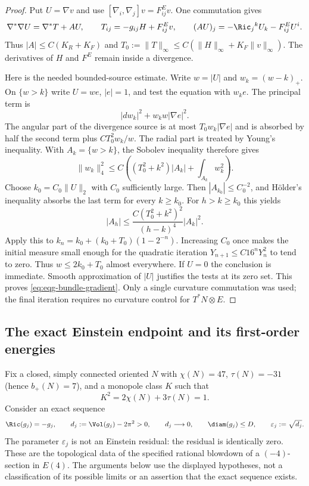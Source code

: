 \begin{proof}
Put $U=\nabla v$ and use $[\nabla_i,\nabla_j]v=F^E_{ij}v$.
One commutation gives
\[
 \nabla^*\nabla U=\nabla^*T+AU,
 \qquad T_{ij}=-g_{ij}H+F^E_{ij}v,
 \qquad (AU)_j=-\Ric_j{}^kU_k-F^E_{ij}U^i.
\]
Thus $|A|\leq C(K_R+K_F)$ and
$T_0:=\|T\|_\infty\leq C(\|H\|_\infty+K_F\|v\|_\infty)$.
The derivatives of $H$ and $F^E$ remain inside a divergence.

Here is the needed bounded-source estimate.  Write $w=|U|$ and
$w_k=(w-k)_+$.  On $\{w>k\}$ write $U=we$, $|e|=1$,
and test the equation with $w_ke$.  The principal term is
\[
 |dw_k|^2+w_kw|\nabla e|^2.
\]
The angular part of the divergence source is at most
$T_0w_k|\nabla e|$ and is absorbed by half the second term plus
$C T_0^2w_k/w$.  The radial part is treated by Young's inequality.
With $A_k=\{w>k\}$, the Sobolev inequality therefore gives
\[
 \|w_k\|_4^2
 \leq C\left((T_0^2+k^2)|A_k|
                     +\int_{A_k}w_k^2\right).
\]
Choose $k_0=C_0\|U\|_2$ with $C_0$ sufficiently large.
Then $|A_{k_0}|\leq C_0^{-2}$, and Hölder's inequality absorbs the
last term for every $k\geq k_0$.  For $h>k\geq k_0$ this yields
\[
 |A_h|\leq
 \frac{C(T_0^2+k^2)^2}{(h-k)^4}|A_k|^2.
\]
Apply this to $k_n=k_0+(k_0+T_0)(1-2^{-n})$.
Increasing $C_0$ once makes the initial measure small enough for the
quadratic iteration $Y_{n+1}\leq C16^nY_n^2$ to tend to zero.
Thus $w\leq2k_0+T_0$ almost everywhere.  If $U=0$ the conclusion
is immediate.  Smooth approximation of $|U|$ justifies the tests at
its zero set.  This proves \eqref{eq:eqg-bundle-gradient}.
Only a single curvature commutation was used; the final iteration
requires no curvature control for $T^*N\otimes E$.
\end{proof}

\subsection{The exact Einstein endpoint and its first-order energies}

Fix a closed, simply connected oriented $N$ with
$\chi(N)=47$, $\tau(N)=-31$ (hence $b_+(N)=7$), and a monopole
class $K$ such that
\begin{equation}\label{eq:eqg-endpoint-topology}
 K^2=2\chi(N)+3\tau(N)=1.
\end{equation}
Consider an exact sequence
\begin{equation}\label{eq:eqg-endpoint-sequence}
 \Ric(g_j)=-g_j,\qquad
 d_j:=\Vol(g_j)-2\pi^2>0,\qquad d_j\longrightarrow0,
 \qquad\diam(g_j)\leq D,
 \qquad\varepsilon_j:=\sqrt{d_j}.
\end{equation}
The parameter $\varepsilon_j$ is not an Einstein residual: the residual
is identically zero.  These are the topological data of the specified
rational blowdown of a $(-4)$-section in $E(4)$.  The arguments below
use the displayed hypotheses, not a classification of its possible
limits or an assertion that the exact sequence exists.

